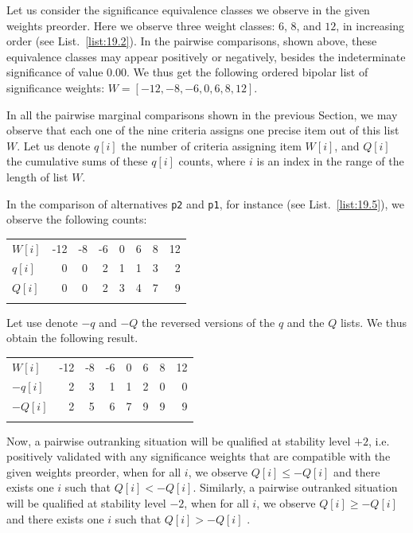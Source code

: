 Let us consider the significance equivalence classes we observe in the given weights preorder. Here we observe three weight classes: $6$, $8$, and $12$, in increasing order (see List.~\vref{list:19.2}). In the pairwise comparisons, shown above, these equivalence classes may appear positively or negatively, besides the indeterminate significance of value $0.00$. We thus get the following ordered bipolar list of significance weights: $W = [-12, -8, -6, 0, 6, 8, 12]$.

In all the pairwise marginal comparisons shown in the previous Section, we may observe that each one of the nine criteria assigns one precise item out of this list $W$. Let us denote $q[i]$ the number of criteria assigning item $W[i]$, and $Q[i]$ the cumulative sums of these $q[i]$ counts, where $i$ is an index in the range of the length of list $W$.

In the comparison of alternatives \texttt{p2} and \texttt{p1}, for instance (see List.~\vref{list:19.5}), we observe the following counts: \hfill
\begin{center}
\begin{tabular}{l|r|r|r|r|r|r|r}
 \svhline\noalign{\smallskip}
  $W[i]$ & -12 & -8  & -6  &  0  &  6  &  8 &  12\\  
 \noalign{\smallskip}\hline\noalign{\smallskip}
$q[i]$  &  0 &  0 &   2 &   1  &  1  &  3  &  2 \\
$Q[i]$  &  0 &  0 &   2 &   3  &  4  &  7  &  9 \\
      \noalign{\smallskip}\hline
\end{tabular}
\end{center}

Let use denote $-q$ and $-Q$ the reversed versions of the $q$ and the $Q$ lists. We thus obtain the following result.\hfill
\begin{center}
\begin{tabular}{l|r|r|r|r|r|r|r}
 \svhline\noalign{\smallskip}
  $W[i]$ & -12 & -8  & -6  &  0  &  6  &  8 &  12\\  
 \noalign{\smallskip}\hline\noalign{\smallskip}
  $-q[i]$  &  2 &  3 &   1 &   1  &  2  &  0  &  0 \\
  $-Q[i]$  &  2 &  5 &   6 &   7  &  9  &  9  &  9 \\
 \noalign{\smallskip}\hline
\end{tabular}
\end{center}

Now, a pairwise outranking situation will be qualified at stability level $+2$, i.e. positively validated with any significance weights that are compatible with the given weights preorder, when for all $i$, we observe $Q[i] \leq -Q[i]$ and there exists one $i$ such that $Q[i] < -Q[i]$. Similarly, a pairwise outranked situation will be qualified at stability level $-2$, when for all $i$, we observe $Q[i] \geq -Q[i]$ and there exists one $i$ such that $Q[i] > -Q[i]$ \citep{BIS-2004c}.

